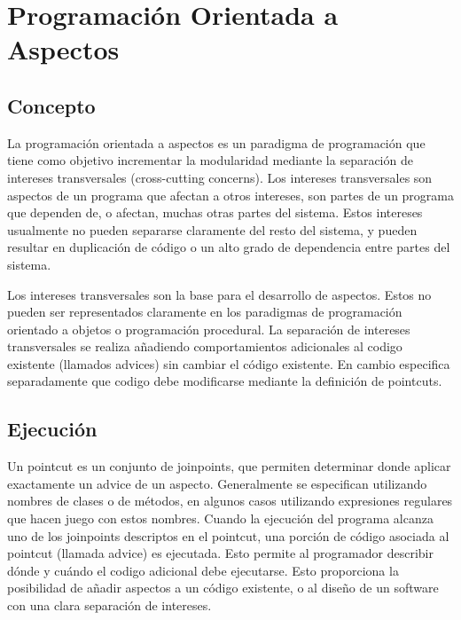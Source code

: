 \section{Programación Orientada a Aspectos}


\subsection{Concepto}

La programación orientada a aspectos es un paradigma de programación que tiene
como objetivo incrementar la modularidad mediante la separación de intereses
transversales (cross-cutting concerns). 
Los intereses transversales son aspectos de un programa que afectan a otros
intereses, son partes de un programa que dependen de, o afectan, muchas
otras partes del sistema.
Estos intereses usualmente no pueden separarse claramente del resto del
sistema, y pueden resultar en duplicación de código o un alto grado de
dependencia entre partes del sistema.


Los intereses transversales son la base para el desarrollo de aspectos. Estos no
pueden ser representados claramente en los paradigmas de programación orientado
a objetos o programación procedural.
La separación de intereses transversales se realiza añadiendo comportamientos
adicionales al codigo existente (llamados advices) sin cambiar el
código existente. En cambio especifica separadamente que codigo debe modificarse
mediante la definición de pointcuts. 
 
\subsection{Ejecución}


Un pointcut es un conjunto de joinpoints, que permiten
determinar donde aplicar exactamente un advice de un aspecto. Generalmente
se especifican utilizando nombres de clases o de métodos, en algunos casos
utilizando expresiones regulares que hacen juego con estos nombres. Cuando la
ejecución del programa alcanza uno de los joinpoints descriptos en el pointcut,
una porción de código asociada al pointcut (llamada advice) es ejecutada. Esto
permite al programador describir dónde y cuándo el codigo adicional debe
ejecutarse. Esto proporciona la posibilidad de añadir aspectos a un código
existente, o al diseño de un software con una clara separación de intereses.
